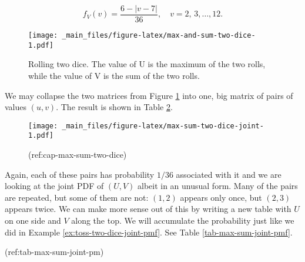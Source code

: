 \documentclass[]{book}
\numberwithin{equation}{chapter}
\numberwithin{figure}{chapter}
\theoremstyle{plain}
\theoremstyle{definition}
\theoremstyle{remark}
\theoremstyle{definition}
\theoremstyle{definition}
\theoremstyle{remark}
\begin{document}
\begin{equation}
f_{V}(v)=\frac{6-|v-7|}{36},\quad v=2,\,3,\ldots,12.
\end{equation}

\begin{figure}[htbp]
\centering
\texttt{[image: \_main\_files/figure-latex/max-and-sum-two-dice-1.pdf]}
\caption{\label{fig:max-and-sum-two-dice}\small Rolling two dice. The value of U
is the maximum of the two rolls, while the value of V is the sum of the
two rolls.}
\end{figure}





We may collapse the two matrices from Figure
\ref{fig:max-and-sum-two-dice} into one, big matrix of pairs of values
\((u,v)\). The result is shown in Table
\ref{fig:max-sum-two-dice-joint}.

\begin{figure}[htbp]
\centering
\texttt{[image: \_main\_files/figure-latex/max-sum-two-dice-joint-1.pdf]}
\caption{\label{fig:max-sum-two-dice-joint}(ref:cap-max-sum-two-dice)}
\end{figure}




Again, each of these pairs has probability \(1/36\) associated with it
and we are looking at the joint PDF of \((U,V)\) albeit in an unusual
form. Many of the pairs are repeated, but some of them are not:
\((1,2)\) appears only once, but \((2,3)\) appears twice. We can make
more sense out of this by writing a new table with \(U\) on one side and
\(V\) along the top. We will accumulate the probability just like we did
in Example \ref{ex:toss-two-dice-joint-pmf}. See Table
\ref{tab-max-sum-joint-pmf}.

(ref:tab-max-sum-joint-pm)
\end{document}
